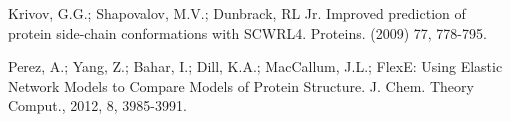 \documentclass[12pt]{article}
\begin{document}
\begin{thebibliography}{99}

Krivov, G.G.; Shapovalov, M.V.; Dunbrack, RL Jr. Improved prediction of protein side-chain conformations with SCWRL4.
Proteins. (2009) 77, 778-795.

Perez, A.; Yang, Z.; Bahar, I.; Dill, K.A.; MacCallum, J.L.; FlexE: Using Elastic Network Models to Compare Models of Protein Structure. J. Chem. Theory Comput., 2012, 8, 3985-3991.

\end{thebibliography}

\end{document}
